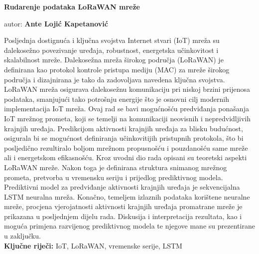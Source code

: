 \thispagestyle{plain}
\begin{center}       
    \large
    \vspace{0.9cm}
    \textbf{Rudarenje podataka LoRaWAN mreže}
        
    \vspace{0.4cm}
    autor: \textbf{Ante Lojić Kapetanović}
    
\end{center}
Posljednja dostignuća i ključna svojstva Internet stvari (IoT) mreža su dalekosežno povezivanje uređaja, robustnost, energetska učinkovitost i skalabilnost mreže.
Dalekosežna mreža širokog područja (LoRaWAN) je definirana kao protokol kontrole pristupa mediju (MAC) za mreže širokog područja i dizajnirana je tako da zadovoljava navedena ključna svojstva.
LoRaWAN mreža osigurava dalekosežnu komunikaciju pri niskoj brzini prijenosa podataka, smanjujući tako potrošnju energije što je osnovni cilj modernih implementacija IoT mreža.
Ovaj rad se bavi mogućnošću predviđanja ponašanja IoT mrežnog prometa, koji se temelji na komunikaciji neovisnih i nepredvidljivih krajnjih uređaja.
Predikcijom aktivnosti krajnjih uređaja za blisku budućnost, osigurala bi se mogućnost definiranja učinkovitijih pristupnih protokola, što bi posljedično rezultiralo boljom mrežnom propusnošću i pouzdanošću same mreže ali i energetskom efikasnošću.
Kroz uvodni dio rada opisani su teoretski aspekti LoRaWAN mreže. 
Nakon toga je definirana struktura snimanog mrežnog prometa, pretvorba u vremensku seriju i prijedlog prediktivnog modela.
Prediktivni model za predviđanje aktivnosti krajnjih uređaja je sekvencijalna LSTM neuralna mreža.
Konačno, temeljem izlaznih podataka korištene neuralne mreže, procjena vjerojatnosti aktivnosti krajnjih uređaja promatrane mreže je prikazana u posljednjem dijelu rada.
Diskusija i interpretacija rezultata, kao i moguća primjena razvijenog prediktivnog modela te njegove mane su prezentirane u zaključku.\\

\textbf{Ključne riječi:} IoT, LoRaWAN, vremenske serije, LSTM
